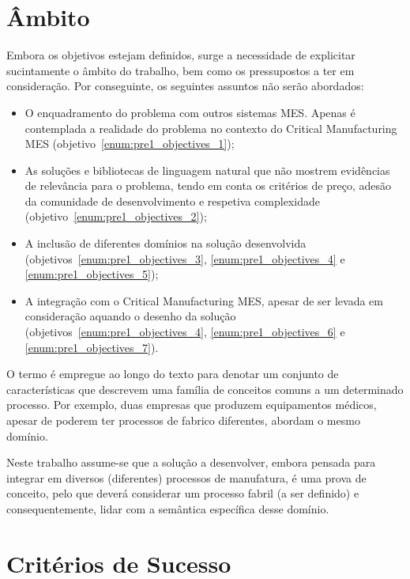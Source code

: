 \section{Âmbito}

Embora os objetivos estejam definidos, surge a necessidade de explicitar sucintamente o âmbito do trabalho, bem como os pressupostos a ter em consideração. Por conseguinte, os seguintes assuntos não serão abordados:

\begin{itemize}
    \item
    {
        O enquadramento do problema com outros sistemas \gls{MES}. Apenas é contemplada a realidade do problema no contexto do Critical Manufacturing \gls{MES} (objetivo~\ref{enum:pre1_objectives_1});
    }
    \item
    {
        As soluções e bibliotecas de linguagem natural que não mostrem evidências de relevância para o problema, tendo em conta os critérios de preço, adesão da comunidade de desenvolvimento e respetiva complexidade (objetivo~\ref{enum:pre1_objectives_2});
    }
    \item 
    {
        A inclusão de diferentes domínios na solução desenvolvida (objetivos~\ref{enum:pre1_objectives_3}, \ref{enum:pre1_objectives_4} e \ref{enum:pre1_objectives_5});
    }
    \item 
    {
        A integração com o Critical Manufacturing \gls{MES}, apesar de ser levada em consideração aquando o desenho da solução (objetivos~\ref{enum:pre1_objectives_4}, \ref{enum:pre1_objectives_6} e \ref{enum:pre1_objectives_7}).
    }
\end{itemize}

O termo  é empregue ao longo do texto para denotar um conjunto de características que descrevem uma família de conceitos comuns a um determinado processo. Por exemplo, duas empresas que produzem equipamentos médicos, apesar de poderem ter processos de fabrico diferentes, abordam o mesmo domínio.

Neste trabalho assume-se que a solução a desenvolver, embora pensada para integrar em diversos (diferentes) processos de manufatura, é uma prova de conceito, pelo que deverá considerar um processo fabril (a ser definido) e consequentemente, lidar com a semântica específica desse domínio.

\section{Critérios de Sucesso}
\label{sec:pre1_success_criteria}

